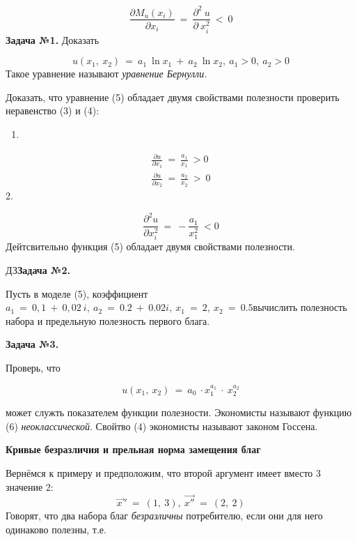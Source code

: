 \documentclass[12pt,a4paper]{article}
\begin{document}
\begin{equation}
\frac{\partial M_{u}( x_{i})}{\partial x_{i}} \ =\ \frac{\partial ^{2} \ u}{\partial \ x^{2}_{i}} \ < \ 0
\end{equation}
\textbf{Задача №1.} Доказать 


\begin{equation}
u( x_{1} ,\ x_{2}) \ =\ a_{1} \ \ln x_{1} \ +\ a_{2} \ \ln x_{2} ,\ a_{1}  >0,\ a_{2}  >0
\end{equation}
Такое уравнение называют \textit{уравнение Бернулли.}

Доказать, что уравнение (5) обладает двумя свойствами полезности проверить неравенство (3) и (4):
\begin{enumerate}
\item 
\end{enumerate}
\begin{gather}
\frac{\partial u}{\partial x_{1}} \ =\ \frac{a_{1}}{x_{1}} \  >0\\
\frac{\partial u}{\partial x_{2}} \ =\ \frac{a_{2}}{x_{2}} \  >\ 0
\end{gather}
	2.


\begin{equation}
\frac{\partial ^{2} u}{\partial x^{2}_{i}} \ =\ -\frac{a_{1}}{x^{2}_{1}} \ < 0
\end{equation}
 Дейтсвительно функция (5) обладает двумя свойствами полезности.

$\displaystyle \boxed{\text{ДЗ}}$\textbf{Задача №2. }

Пусть в моделе (5), коэффициент $\displaystyle a_{1} \ =\ 0,1\ +\ 0,02\ i,\ a_{2} \ =\ 0.2\ +\ 0.02i,\ x_{1} \ =\ 2,\ x_{2} \ =\ 0.5$вычислить полезность набора и предельную полезность первого блага. 

\textbf{Задача №3.}

Проверь, что \ 


\begin{equation}
u( x_{1} ,\ x_{2}) \ =\ a_{0} \ \cdot x^{a_{1}}_{1} \ \cdot \ x^{a_{2}}_{2}
\end{equation}


 может служть показателем функции полезности. Экономисты называют функцию (6) \textit{неоклассической}. Свойтво (4) экономисты называют законом Госсена.
\begin{center}
\textbf{Кривые безразличия и прельная норма замещения благ}

\end{center}
	Вернёмся к примеру и предположим, что второй аргумент имеет вместо 3 значение 2:
\begin{equation}
\overrightarrow{x\ } '\ =\ ( 1,\ 3) ,\ \overrightarrow{x''} \ =\ ( 2,\ 2)
\end{equation}
	Говорят, что два набора благ \textit{безразличны} потребителю, если они для него одинаково полезны, т.е. 
\end{document}
